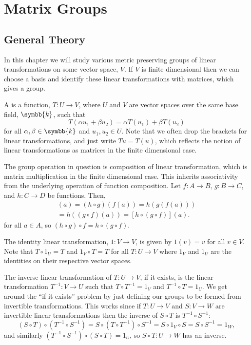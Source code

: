 \documentclass[fleqn]{NotesClass}
\newcommand{\ident}{1}
\renewcommand{\field}{\symbb{k}}
\begin{document}
    \chapter{Matrix Groups}
    \section{General Theory}
    In this chapter we will study various metric preserving groups of linear transformations on some vector space, \(V\).
    If \(V\) is finite dimensional then we can choose a basis and identify these linear transformations with matrices, which gives a group.
    
    A  is a function, \(T \colon U \to V\), where \(U\) and \(V\) are vector spaces over the same base field, \(\field\), such that
    \begin{equation}
        T(\alpha u_1 + \beta u_2) = \alpha T(u_1) + \beta T(u_2)
    \end{equation}
    for all \(\alpha, \beta \in \field\) and \(u_1, u_2 \in U\).
    Note that we often drop the brackets for linear transformations, and just write \(Tu = T(u)\), which reflects the notion of linear transformations as matrices in the finite dimensional case.
    
    The group operation in question is composition of linear transformation, which is matrix multiplication in the finite dimensional case.
    This inherits associativity from the underlying operation of function composition.
    Let \(f \colon A \to B\), \(g \colon B \to C\), and \(h \colon C \to D\) be functions.
    Then,
    \begin{multline}
        [(h \circ g) \circ f](a) = (h \circ g)(f(a)) = h(g(f(a)))\\
        = h((g \circ f)(a)) = [h \circ (g \circ f)](a).
    \end{multline}
    for all \(a \in A\), so \((h \circ g) \circ f = h \circ (g \circ f)\).
    
    The identity linear transformation, \(\ident \colon V \to V\), is given by \(\ident(v) = v\) for all \(v \in V\).
    Note that \(T \circ \ident_U = T\) and \(\ident_V \circ T = T\) for all \(T \colon U \to V\) where \(\ident_V\) and \(\ident_U\) are the identities on their respective vector spaces.
    
    The inverse linear transformation of \(T \colon U \to V\), if it exists, is the linear transformation \(T^{-1}\colon V \to U\) such that \(T \circ T^{-1} = \ident_V\) and \(T^{-1} \circ T = \ident_U\).
    We get around the \enquote{if it exists} problem by just defining our groups to be formed from invertible transformations.
    This works since if \(T \colon U \to V\) and \(S \colon V \to W\) are invertible linear transformations then the inverse of \(S \circ T\) is \(T^{-1} \circ S^{-1}\):
    \begin{equation}
        (S \circ T) \circ (T^{-1} \circ S^{-1}) = S \circ (T \circ T^{-1}) \circ S^{-1} = S \circ \ident_V \circ S = S \circ S^{-1} = \ident_W,
    \end{equation}
    and similarly \((T^{-1} \circ S^{-1}) \circ (S \circ T) = \ident_U\), so \(S \circ T \colon U \to W\) has an inverse.
    
\end{document}
